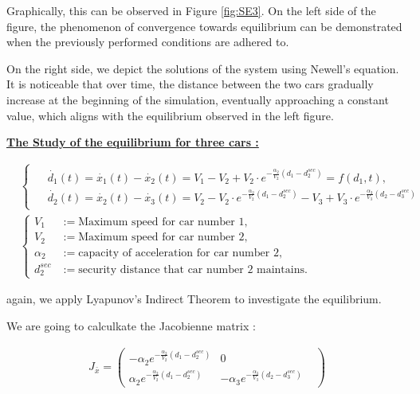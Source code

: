 \documentclass{article}
\begin{document}
		Graphically, this can be observed in Figure \ref{fig:SE3}. On the left side of the figure, the phenomenon of convergence towards equilibrium can be demonstrated when the previously performed conditions are adhered to.
	
	On the right side, we depict the solutions of the system using Newell's equation. It is noticeable that over time, the distance between the two cars gradually increase at the beginning of the simulation, eventually approaching a constant value, which aligns with the equilibrium observed in the left figure.
	
	\textbf{\underline{The Study of the equilibrium for three cars : }} \newline\newline
	
	\begin{align*}
		&\begin{cases}
			\begin{aligned}
				&\dot{d_1}(t) = \dot{x_1}(t) - \dot{x_2}(t) = V_1 - V_2 + V_2 \cdot e^{-\frac{\alpha_2}{V_2}(d_1 - d_{2}^{sec})} = f(d_1, t), \\
				&\dot{d_2}(t) = \dot{x_2}(t)-\dot{x_3}(t) = V_2 - V_2 \cdot e^{-\frac{\alpha_2}{V_2}(d_1 - d_{2}^{sec})} - V_3 + V_3 \cdot e^{-\frac{\alpha_3}{V_3}(d_2 - d_{3}^{sec})}
			\end{aligned}
		\end{cases}
		 \\
		&\left\{
		\begin{aligned}
			V_1 &:= \text{Maximum speed for car number 1}, \\
			V_2 &:= \text{Maximum speed for car number 2}, \\
			\alpha_2 &:= \text{capacity of acceleration for car number 2}, \\
			d_{2}^{sec} &:= \text{security distance that car number 2 maintains}.
		\end{aligned}
		\right.
	\end{align*}
	
	again, we apply Lyapunov's Indirect Theorem to investigate the equilibrium.
	
	
	We are going to calculkate the Jacobienne matrix : 
	
	\begin{align*}
		J_{\bar{x}}=\begin{pmatrix}
			-\alpha_2e^{-\frac{\alpha_2}{V_2}(d_1 - d_{2}^{sec})} & 0 & \\
			\alpha_2e^{-\frac{\alpha_2}{V_2}(d_1 - d_{2}^{sec})} & -\alpha_3e^{-\frac{\alpha_3}{V_3}(d_2 - d_{3}^{sec})} &
		\end{pmatrix}
	\end{align*}
	
\end{document}
